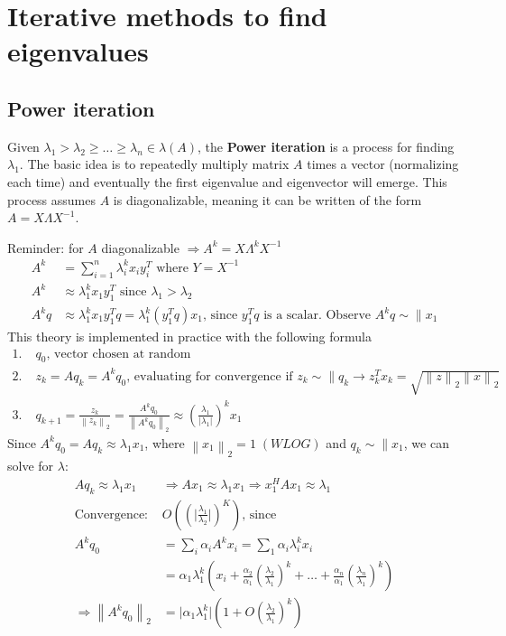 \documentclass{article}
\newcommand{\norm}[2]{\left\lVert#1\right\rVert_#2}
\newcommand{\abs}[1]{\lvert#1\rvert}
\begin{document}
\section{Iterative methods to find eigenvalues}
\subsection{Power iteration}
Given $\lambda_1 > \lambda_2 \geq \dots \geq \lambda_n \in \lambda(A)$, the \textbf{Power iteration} is a process for finding $\lambda_1$. The basic idea is to repeatedly multiply matrix $A$ times a vector (normalizing each time) and eventually the first eigenvalue and eigenvector will emerge. This process assumes $A$ is diagonalizable, meaning it can be written of the form $A = X\Lambda X^{-1}$.

Reminder: for $A$ diagonalizable $\Longrightarrow A^k = X \Lambda^k X^{-1}$
\begin{align*}
    A^k &= \sum_{i = 1}^n \lambda_i^k x_i y_i^T \textrm{ where $Y = X^{-1}$}\\
    A^k &\approx \lambda_1^kx_1y_1^T \textrm{ since } \lambda_1 > \lambda_2\\
    A^kq &\approx \lambda_1^kx_1y_1^Tq = \lambda_1^k(y_1^Tq)x_1 \textrm{, since $y_1^Tq$ is a scalar. Observe } A^kq \sim \parallel x_1
\end{align*}
This theory is implemented in practice with the following formula
\begin{align*}
    1. \;& q_0 \textrm{, vector chosen at random}\\
    2. \;& z_k = Aq_k = A^kq_0 \textrm{, evaluating for convergence if } z_k \sim \parallel q_k \rightarrow z_k^Tx_k = \sqrt{\norm{z}{2}\norm{x}{2}}\\
    3. \;& q_{k+1} = \frac{z_k}{\norm{z_k}{2}} = \frac{A^kq_0}{\norm{A^kq_0}{2}} \approx (\frac{\lambda_1}{\abs{\lambda_1}})^kx_1
\end{align*}
Since $A^{k}q_0 = Aq_{k} \approx \lambda_1 x_1$, where $\norm{x_1}{2} = 1 \; (WLOG)$ and $q_k \sim \parallel x_1$, we can solve for $\lambda$:
\begin{align*}
    Aq_k \approx \lambda_1 x_1 &\Longrightarrow Ax_1 \approx \lambda_1x_1 \Rightarrow x_1^HAx_1 \approx \lambda_1\\
    \textrm{Convergence: } &O((\abs{\frac{\lambda_1}{\lambda_2}})^K) \textrm{, since}\\
    A^kq_0 &= \sum_i \alpha_i A^k x_i = \sum_1 \alpha_i \lambda_i^k x_i\\
    &= \alpha_1\lambda_1^k(x_i + \frac{\alpha_2}{\alpha_1}(\frac{\lambda_2}{\lambda_1})^k + \dots + \frac{\alpha_n}{\alpha_1}(\frac{\lambda_n}{\lambda_1})^k) \\
    \Longrightarrow \norm{A^kq_0}{2} &= \abs{\alpha_1\lambda_1^k}(1 + O(\frac{\lambda_2}{\lambda_1})^k) 
\end{align*}
\end{document}
